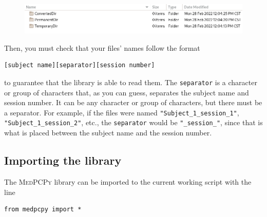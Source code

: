 \documentclass[a4paper,12pt]{article}
\begin{document}
\begin{figure}[!ht]
    \begin{center}
        \includegraphics[scale=0.7]{directories.png}
    \end{center}
\end{figure}

Then, you must check that your files' names follow the format

\begin{tcolorbox}[
    enhanced,
    attach boxed title to top left={xshift=6mm,yshift=-3mm},
    colback=lightgreen!20,
    colframe=lightgreen,
    sharp corners,
    ]
    \begin{verbatim}
[subject name][separator][session number]
    \end{verbatim}
\end{tcolorbox}
\noindent to guarantee that the library is able to read them. The \verb|separator| is a character or group of characters that, as you can guess, separates the subject name and session number. It can be any character or group of characters, but there must be a separator. For example, if the files were named \verb|"Subject_1_session_1"|, \verb|"Subject_1_session_2"|, etc., the \verb|separator| would be \verb|"_session_"|, since that is what is placed between the subject name and the session number.

\subsection{Importing the library}

The {\scshape MedPCPy} library can be imported to the current working script with the line

\begin{tcolorbox}[
    enhanced,
    attach boxed title to top left={xshift=6mm,yshift=-3mm},
    colback=lightgreen!20,
    colframe=lightgreen,
    colbacktitle=lightgreen,
    title=Python,
    fonttitle=\bfseries\color{black},
    boxed title style={size=small,colframe=lightgreen,sharp corners},
    sharp corners,
    ]
    \begin{verbatim}
from medpcpy import *
    \end{verbatim}
\end{tcolorbox}
\end{document}
